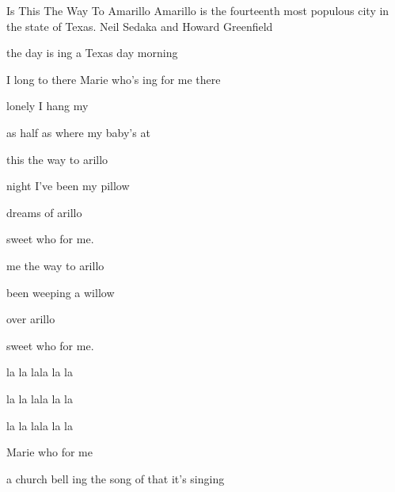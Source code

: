 \begin{SBSong}{Is This The Way To Amarillo}
  {Amarillo is the fourteenth most populous city in the state of Texas.}
  {Neil Sedaka and Howard Greenfield}
  \begin{SBVerse}
     the day is ing  a Texas day morning
    
     I long to  there  Marie who's ing for me there
    
     lonely   I hang my 
    
     as half as   where my baby's at
  \end{SBVerse}
  \begin{SBChorus}
     this the way to arillo 
    
     night I've been  my pillow 
    
     dreams of arillo 
    
     sweet  who  for me.
    
     me the way to arillo 
    
     been weeping  a willow 
    
     over arillo 
    
     sweet  who  for me.
  \end{SBChorus}
  \begin{SBVerse}
     la la lala la la  
    
     la la lala la la  
     
     la la lala la la 
    
     Marie who  for me
    
     a church bell ing  the song of  that it's singing
    

\end{SBVerse}
\end{SBSong}
